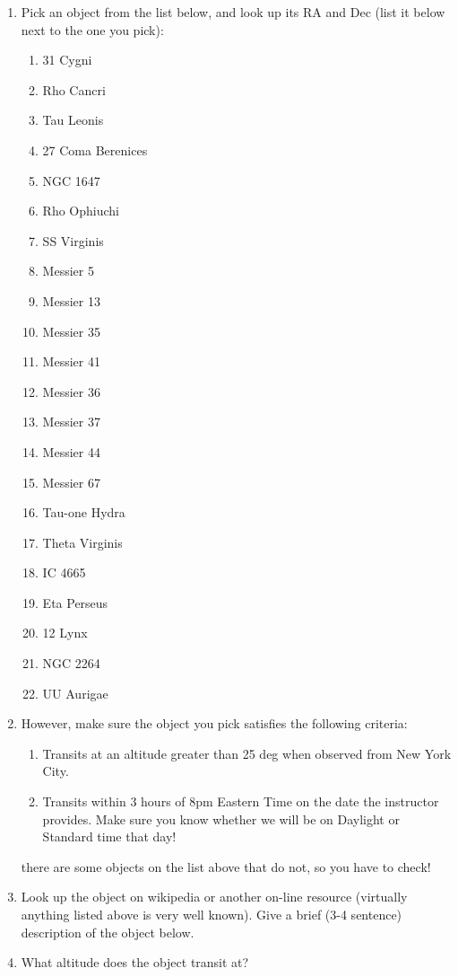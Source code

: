 \begin{enumerate}
\item Pick an object from the list below, and look up its RA and Dec
  (list it below next to the one you pick):
\begin{enumerate}
\item 31 Cygni
\item Rho Cancri
\item Tau Leonis
\item 27 Coma Berenices
\item NGC 1647
\item Rho Ophiuchi
\item SS Virginis
\item Messier 5
\item Messier 13
\item Messier 35
\item Messier 41
\item Messier 36
\item Messier 37
\item Messier 44
\item Messier 67
\item Tau-one Hydra
\item Theta Virginis
\item IC 4665
\item Eta Perseus
\item 12 Lynx
\item NGC 2264
\item UU Aurigae
\end{enumerate}
\item However, make sure the object you pick satisfies the following
criteria:
\begin{enumerate}
\item Transits at an altitude greater than 25 deg when observed from New York City.
\item Transits within 3 hours of 8pm Eastern Time on the date
the instructor provides. Make sure you know whether we will be on
Daylight or Standard time that day!
\end{enumerate}
there are some objects on the list above that do not, so you have to
check!
\item Look up the object on wikipedia or another on-line resource
(virtually anything listed above is very well known). Give a brief
(3-4 sentence) description of the object below.
\vspace{80pt}
\item What altitude does the object transit at?
\vspace{40pt}

\end{enumerate}
